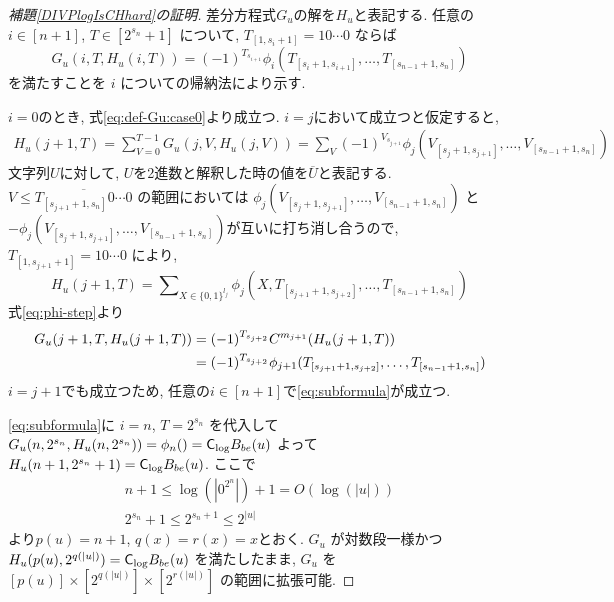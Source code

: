 \begin{proof}[\textup{補題\ref{DIVPlogIsCHhard}の証明}]
 差分方程式$G_u$の解を$H_u$と表記する.
 任意の $i \in [n+1]$, $T \in [2^{s_n}+1]$ について,
 $T_{[1, s_i +1]} = 10 \cdots 0$ ならば
 \begin{equation} \label{eq:subformula}
  G_u(i,T,H_u(i,T)) = (-1)^{T_{s_{i+1}}} 
   \phi_i(T_{[s_i+1, s_{i+1}]}, \dots, T_{[s_{n-1}+1, s_n]})
 \end{equation}
 を満たすことを $i$ についての帰納法により示す.

 $i=0$のとき, 式\eqref{eq:def-Gu:case0}より成立つ.
 $i=j$において成立つと仮定すると, 
 \begin{align}
  H_u(j+1, T) 
  = \sum_{V = 0}^{T-1} G_u(j, V, H_u(j, V)) 
  = \sum_{V} (-1)^{V_{s_{j+1}}} \phi_j(V_{[s_j+1, s_{j+1}]}, 
   \dots, V_{[s_{n-1}+1, s_n]})
 \end{align}
 文字列$U$に対して, $U$を2進数と解釈した時の値を$\overline U$と表記する.
 $V \le \overline{T_{[s_{j+1}+1, s_n]} 0 \cdots 0}$ の範囲においては
 $\phi_j(V_{[s_j+1, s_{j+1}]}, \dots, V_{[s_{n-1}+1, s_n]})$ と
 $- \phi_j(V_{[s_j+1, s_{j+1}]}, \dots, V_{[s_{n-1}+1, s_n]})$が互いに打ち消し合うので, $T_{[1,s_{j+1} +1]} = 10 \cdots 0$ により,
 \begin{equation}
  H_u(j+1, T) = \sum\nolimits_{X \in \{0,1\}^{l_j}} 
  \phi_j(X, T_{[s_{j+1}+1, s_{j+2}]}, \dots, T_{[s_{n-1}+1, s_n]})
 \end{equation}
 式\eqref{eq:phi-step}より
 \begin{align}
  G_u(j+1,T,H_u(j+1,T)) 
  &= (-1)^{T_{s_{j+2}}} C^{m_{j+1}} (H_u(j+1, T))
\notag
\\
  &= (-1)^{T_{s_{j+2}}} \phi_{j+1}(T_{[s_{j+1}+1, s_{j+2}]}, \dots, T_{[s_{n-1}+1, s_n]})
 \end{align}
 $i=j+1$でも成立つため, 任意の$i \in [n+1]$で\eqref{eq:subformula}が成立つ.


 \eqref{eq:subformula}に $i=n$, $T=2^{s_n}$ を代入して 
 $G_u(n, 2^{s_n}, H_u(n,2^{s_n})) = \phi_n() = \mathsf{C}_{\log} B_{be}(u)$
 よって $H_u(n+1, 2^{s_n}+1) = \mathsf{C}_{\log} B_{be}(u)$.
 ここで 
 \begin{gather}
  n+1 \le \log(|0^{2^n}|) + 1 = O(\log(|u|)) \\
  2^{s_n}+1 \le 2^{s_n+1} \le 2^{|u|}
 \end{gather}
 より$p(u) = n+1$, $q(x) = r(x) = x$とおく. $G_u$ が対数段一様かつ
 $H_u(p(u), 2^{q(|u|)}) = \mathsf{C}_{\log} B_{be}(u)$ を満たしたまま,
 $G_u$ を $[p(u)] \times [2^{q(|u|)}] \times [2^{r(|u|)}]$ の範囲に拡張可能.
 \end{proof}



